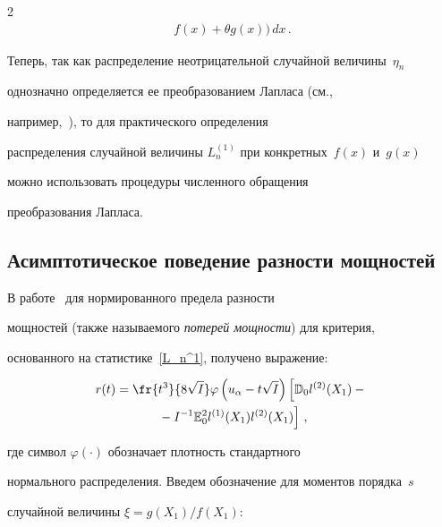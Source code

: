 \begin{multicols}{2}
\begin{multline*}
f(x)+\theta  g(x))\,dx\,.

\end{multline*}

Теперь, так как распределение неотрицательной случайной величины~$\eta_n$ 

однозначно определяется ее преобразованием Лапласа (см.,

например,~\cite{Feller2010}), то для практического определения

распределения случайной величины $L_n^{(1)}$ при конкретных~$f(x)$ и~$g(x)$ 

мож\-но использовать процедуры численного обращения

преобразования Лапласа.



\subsection{Асимптотическое поведение разности мощностей}



В работе~\cite{Bening2000} для нормированного предела раз\-ности

мощностей (также называемого \textit{потерей мощ\-ности}) для критерия,

основанного на статистике~\eqref{L_n^1}, получено выражение:



\noindent

\begin{multline}

\label{r(t)}

r(t)=\fr{t^3}{8\sqrt{I}}\varphi\left(u_\alpha-t\sqrt{I}\right)\left[\Dd_0

l^{(2)}(X_1)-{}\right.\\

\left.{}-I^{-1}\E_0^2l^{(1)}(X_1)l^{(2)}(X_1)\right]\,,

\end{multline}

где символ $\varphi(\cdot)$ обозначает плотность стандартного

нормального распределения. Введем обозначение для моментов порядка~$s$ 

случайной величины $\xi={{g(X_1)}/{f(X_1)}}$:



\noindent

\begin{multline}

\label{Psis}


\end{multline}
\end{multicols}
